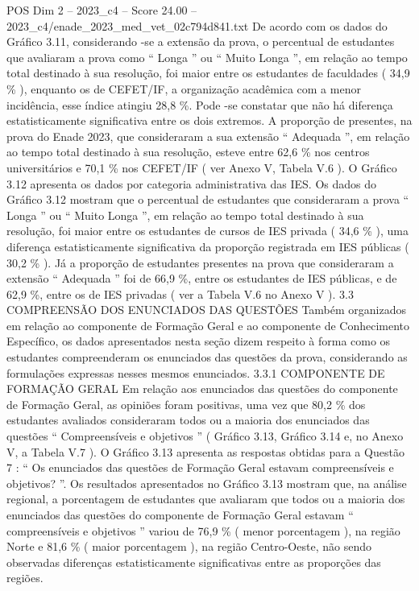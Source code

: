 \begin{textsample}{POS Dim 2 – 2023\_c4 – Score 24.00 – 2023\_c4/enade\_2023\_med\_vet\_02c794d841.txt}
De acordo com os dados do Gráfico 3.11, considerando -se a extensão da prova, o percentual de estudantes que avaliaram a prova como “ Longa ” ou “ Muito Longa ”, em relação ao tempo total destinado à sua resolução, foi maior entre os estudantes de faculdades ( 34,9 \% ), enquanto os de CEFET/IF, a organização acadêmica com a menor incidência, esse índice atingiu 28,8 \%.
Pode -se constatar que não há diferença estatisticamente significativa entre os dois extremos.
A proporção de presentes, na prova do Enade 2023, que consideraram a sua extensão “ Adequada ”, em relação ao tempo total destinado à sua resolução, esteve entre 62,6 \% nos centros universitários e 70,1 \% nos CEFET/IF ( ver Anexo V, Tabela V.6 ).
O Gráfico 3.12 apresenta os dados por categoria administrativa das IES.
Os dados do Gráfico 3.12 mostram que o percentual de estudantes que consideraram a prova “ Longa ” ou “ Muito Longa ”, em relação ao tempo total destinado à sua resolução, foi maior entre os estudantes de cursos de IES privada ( 34,6 \% ), uma diferença estatisticamente significativa da proporção registrada em IES públicas ( 30,2 \% ).
Já a proporção de estudantes presentes na prova que consideraram a extensão “ Adequada ” foi de 66,9 \%, entre os estudantes de IES públicas, e de 62,9 \%, entre os de IES privadas ( ver a Tabela V.6 no Anexo V ). 3.3 COMPREENSÃO DOS ENUNCIADOS DAS QUESTÕES Também organizados em relação ao componente de Formação Geral e ao componente de Conhecimento Específico, os dados apresentados nesta seção dizem respeito à forma como os estudantes compreenderam os enunciados das questões da prova, considerando as formulações expressas nesses mesmos enunciados. 3.3.1 COMPONENTE DE FORMAÇÃO GERAL Em relação aos enunciados das questões do componente de Formação Geral, as opiniões foram positivas, uma vez que 80,2 \% dos estudantes avaliados consideraram todos ou a maioria dos enunciados das questões “ Compreensíveis e objetivos ” ( Gráfico 3.13, Gráfico 3.14 e, no Anexo V, a Tabela V.7 ).
O Gráfico 3.13 apresenta as respostas obtidas para a Questão 7 : “ Os enunciados das questões de Formação Geral estavam compreensíveis e objetivos? ”.
Os resultados apresentados no Gráfico 3.13 mostram que, na análise regional, a porcentagem de estudantes que avaliaram que todos ou a maioria dos enunciados das questões do componente de Formação Geral estavam “ compreensíveis e objetivos ” variou de 76,9 \% ( menor porcentagem ), na região Norte e 81,6 \% ( maior porcentagem ), na região Centro-Oeste, não sendo observadas diferenças estatisticamente significativas entre as proporções das regiões.

\end{textsample}
